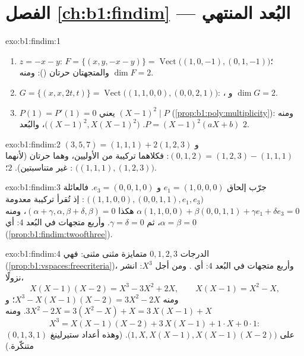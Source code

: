 \section*{الفصل \ref{ch:b1:findim} --- البُعد المنتهي}

\begin{solution}{exo:b1:findim:1}
\begin{enumerate}
  \item $z = -x - y$: $F = \{(x, y, -x-y)\} =
        \operatorname{Vect}\bigl((1,0,-1), (0,1,-1)\bigr)$؛ والمتجهتان
        حرتان (): ومنه $\dim F = 2$.
  \item $G = \{(x, x, 2t, t)\} =
        \operatorname{Vect}\bigl((1,1,0,0), (0,0,2,1)\bigr)$: ، و
        $\dim G = 2$.
  \item $P(1) = P'(1) = 0$ يعني $(X-1)^2 \mid P$
        (\cref{prop:b1:poly:multiplicity}): ومنه $P = (X-1)^2(aX + b)$.
         $\bigl((X-1)^2, X(X-1)^2\bigr)$، والبُعد $2$.
\end{enumerate}
\end{solution}

\begin{solution}{exo:b1:findim:2}
$(3,5,7) = (1,1,1) + 2(1,2,3)$ و $(0,1,2) = (1,2,3) - (1,1,1)$:
فكلاهما تركيبة من الأوليين، وهما حرتان (لأنهما غير
متناسبتين).  $2$؛  :
$\bigl((1,1,1), (1,2,3)\bigr)$.
\end{solution}

\begin{solution}{exo:b1:findim:3}
جرّب إلحاق $e_1 = (1,0,0,0)$ و $e_3 = (0,0,1,0)$. فالعائلة
$\bigl((1,1,0,0), (0,0,1,1), e_1, e_3\bigr)$ : إذ تُقرأ تركيبة
معدومة $\alpha(1,1,0,0) + \beta(0,0,1,1) + \gamma e_1 + \delta
e_3 = 0$ هكذا $(\alpha + \gamma, \alpha, \beta + \delta, \beta) =
0$، ومنه $\alpha = \beta = 0$، ثم $\gamma = \delta = 0$. وأربع متجهات
 في البُعد $4$: أي 
(\cref{prop:b1:findim:twoofthree}).
\end{solution}

\begin{solution}{exo:b1:findim:4}
الدرجات $0, 1, 2, 3$ متمايزة مثنى مثنى: فهي 
(\cref{prop:b1:vspaces:freecriteria})، وأربع متجهات في البُعد
$4$: أي . ومن أجل $X^3$: انشر نزولًا،
\[
X(X-1)(X-2) = X^3 - 3X^2 + 2X,
\qquad
X(X-1) = X^2 - X,
\]
ومنه $X^3 - X(X-1)(X-2) = 3X^2 - 2X$؛ و $3X^2 - 2X = 3(X^2 - X) + X
= 3\,X(X-1) + X$. ومنه
\[
X^3 = X(X-1)(X-2) + 3\,X(X-1) + 1\cdot X + 0\cdot 1 :
\]
 $(0, 1, 3, 1)$ على $\bigl(1, X, X(X-1),
X(X-1)(X-2)\bigr)$. (وهذه أعداد ستيرلينغ متنكّرة.)
\end{solution}

